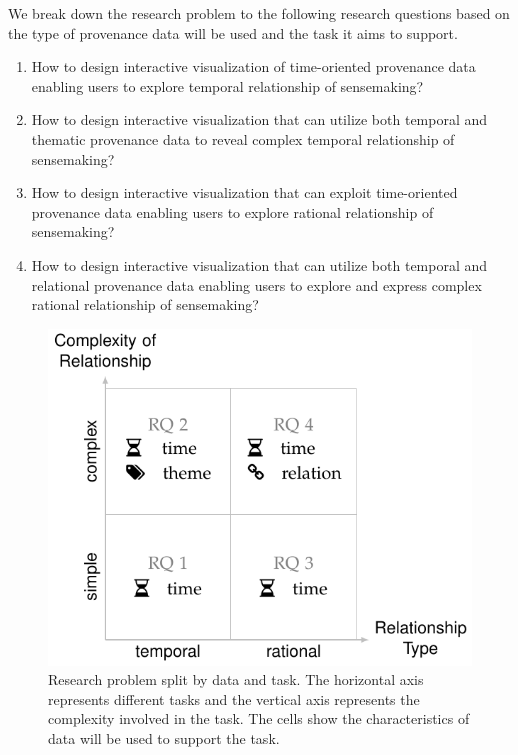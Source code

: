 We break down the research problem to the following research questions based on the type of provenance data will be used and the task it aims to support.

\begin{enumerate}
	\item How to design interactive visualization of time-oriented provenance data enabling users to explore temporal relationship of sensemaking?
	
	\item How to design interactive visualization that can utilize both temporal and thematic provenance data to reveal complex temporal relationship of sensemaking?	
	
	\item How to design interactive visualization that can exploit time-oriented provenance data enabling users to explore rational relationship of sensemaking?
	
	\item How to design interactive visualization that can utilize both temporal and relational provenance data enabling users to explore and express complex rational relationship of sensemaking?				
\end{enumerate}

\begin{figure}[!htb]
	\centering
	\includegraphics{work}
	\caption{Research problem split by data and task. The horizontal axis represents different tasks and the vertical axis represents the complexity involved in the  task. The cells show the characteristics of data will be used to support the task.}
	\label{fig:work}
\end{figure}


